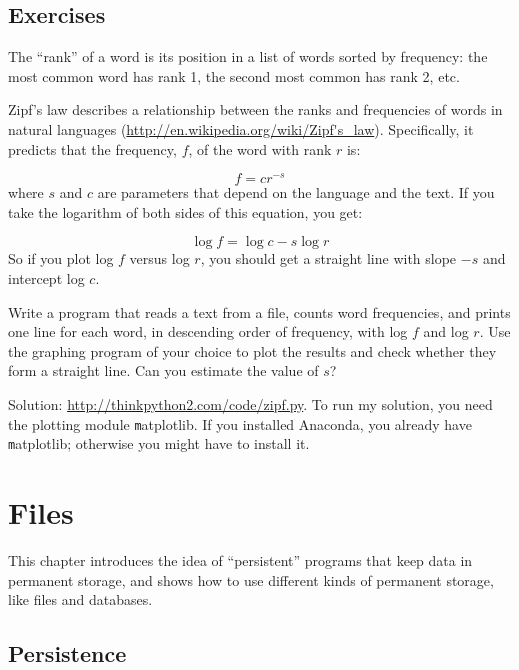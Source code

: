 \documentclass[
DIV=11,
fontsize=12,
twoside,
headinclude=false,
titlepage=firstiscover,
abstract=true,
headsepline=true,
footsepline=true,
chapterprefix=true, %
headings=big,
bibliography=totoc,%
captions=tableheading
]{scrbook}
\theoremstyle{definition}
\begin{document}
\section{Exercises}

\begin{exercise}
\normalfont
{}

The ``rank'' of a word is its position in a list of words
sorted by frequency: the most common word has rank 1, the
second most common has rank 2, etc.

Zipf's law describes a relationship between the ranks and frequencies
of words in natural languages
(\url{http://en.wikipedia.org/wiki/Zipf's_law}).  Specifically, it
predicts that the frequency, $f$, of the word with rank $r$ is:

\[ f = c r^{-s} \]
%
where $s$ and $c$ are parameters that depend on the language and the
text.  If you take the logarithm of both sides of this equation, you
get:

\[ \log f = \log c - s \log r \]
%
So if you plot log $f$ versus log $r$, you should get
a straight line with slope $-s$ and intercept log $c$.

Write a program that reads a text from a file, counts
word frequencies, and prints one line
for each word, in descending order of frequency, with
log $f$ and log $r$.  Use the graphing program of your
choice to plot the results and check whether they form
a straight line.  Can you estimate the value of $s$?

Solution: \url{http://thinkpython2.com/code/zipf.py}.
To run my solution, you need the plotting module {\texttt matplotlib}.
If you installed Anaconda, you already have {\texttt matplotlib};
otherwise you might have to install it.

\end{exercise}



\chapter{Files}

This chapter introduces the idea of ``persistent'' programs that
keep data in permanent storage, and shows how to use different
kinds of permanent storage, like files and databases.


\section{Persistence}
\end{document}
